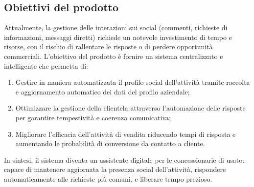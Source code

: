 \subsection{Obiettivi del prodotto}
Attualmente, la gestione delle interazioni sui social (commenti, richieste di informazioni, messaggi diretti) richiede un notevole investimento di tempo e risorse, con il rischio di rallentare le risposte o di perdere opportunità commerciali.
L'obiettivo del prodotto è fornire un sistema centralizzato e intelligente che permetta di:
\begin{enumerate}
    \item Gestire in maniera automatizzata il profilo social dell'attività tramite raccolta e aggiornamento automatico dei dati del profilo aziendale;
    \item Ottimizzare la gestione della clientela attraverso l'automazione delle risposte per garantire tempestività e coerenza comunicativa;
    \item Migliorare l'efficacia dell'attività di vendita riducendo tempi di risposta e aumentando le probabilità di conversione da contatto a cliente.
\end{enumerate}

In sintesi, il sistema diventa un assistente digitale per le concessionarie di usato: capace di mantenere aggiornata la presenza social dell'attività, rispondere automaticamente alle richieste più comuni, e liberare tempo prezioso.